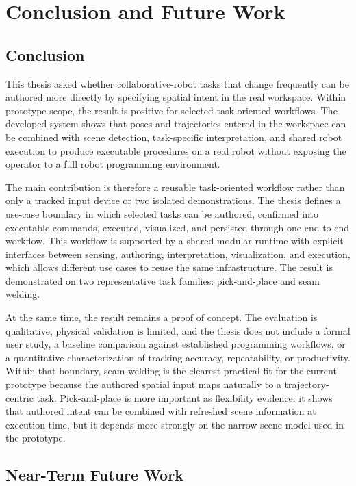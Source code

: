 \chapter{Conclusion and Future Work} \label{chapter:ch7_conclusion}

\section{Conclusion}

This thesis asked whether collaborative-robot tasks that change frequently can be authored more directly by specifying spatial intent in the real workspace. Within prototype scope, the result is positive for selected task-oriented workflows. The developed system shows that poses and trajectories entered in the workspace can be combined with scene detection, task-specific interpretation, and shared robot execution to produce executable procedures on a real robot without exposing the operator to a full robot programming environment.

The main contribution is therefore a reusable task-oriented workflow rather than only a tracked input device or two isolated demonstrations. The thesis defines a use-case boundary in which selected tasks can be authored, confirmed into executable commands, executed, visualized, and persisted through one end-to-end workflow. This workflow is supported by a shared modular runtime with explicit interfaces between sensing, authoring, interpretation, visualization, and execution, which allows different use cases to reuse the same infrastructure. The result is demonstrated on two representative task families: pick-and-place and seam welding.

At the same time, the result remains a proof of concept. The evaluation is qualitative, physical validation is limited, and the thesis does not include a formal user study, a baseline comparison against established programming workflows, or a quantitative characterization of tracking accuracy, repeatability, or productivity. Within that boundary, seam welding is the clearest practical fit for the current prototype because the authored spatial input maps naturally to a trajectory-centric task. Pick-and-place is more important as flexibility evidence: it shows that authored intent can be combined with refreshed scene information at execution time, but it depends more strongly on the narrow scene model used in the prototype.

\section{Near-Term Future Work}

